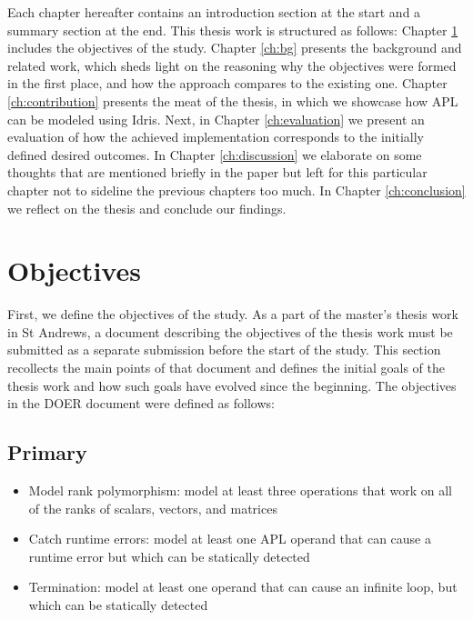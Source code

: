 \documentclass{report}
\begin{document}
Each chapter hereafter contains an introduction section at the start and a summary section at the end. This thesis work is structured as follows: Chapter \ref{ch:obj} includes the objectives of the study. Chapter \ref{ch:bg} presents the background and related work, which sheds light on the reasoning why the objectives were formed in the first place, and how the approach compares to the existing one. Chapter \ref{ch:contribution} presents the meat of the thesis, in which we showcase how APL can be modeled using Idris. Next, in Chapter \ref{ch:evaluation} we present an evaluation of how the achieved implementation corresponds to the initially defined desired outcomes. In Chapter \ref{ch:discussion} we elaborate on some thoughts that are mentioned briefly in the paper but left for this particular chapter not to sideline the previous chapters too much. In Chapter \ref{ch:conclusion} we reflect on the thesis and conclude our findings.

\chapter{Objectives}
\label{ch:obj}


First, we define the objectives of the study. As a part of the master's thesis work in St Andrews, a document describing the objectives of the thesis work must be submitted as a separate submission before the start of the study. This section recollects the main points of that document and defines the initial goals of the thesis work and how such goals have evolved since the beginning. The objectives in the DOER document were defined as follows:

\section{Primary}

\begin{itemize}
  \item Model rank polymorphism: model at least three operations that work on all of the ranks of scalars, vectors, and matrices
  \item Catch runtime errors: model at least one APL operand that can cause a runtime error but which can be statically detected
  \item Termination: model at least one operand that can cause an infinite loop, but which can be statically detected
\end{itemize}
\end{document}
